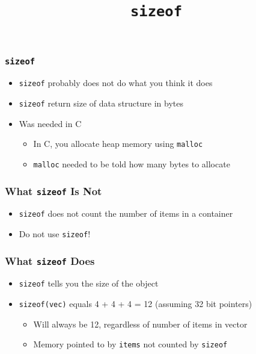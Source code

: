 
\usetikzlibrary{shadows,shapes.multipart}

\title{\texttt{sizeof}}





\begin{frame}
  \titlepage
\end{frame}

\begin{frame}
  \frametitle{\texttt{sizeof}}
  \begin{itemize}
    \item \texttt{sizeof} probably does not do what you think it does
    \item \texttt{sizeof} return size of data structure in bytes
    \item Was needed in C
          \begin{itemize}
            \item In C, you allocate heap memory using \texttt{malloc}
            \item \texttt{malloc} needed to be told how many bytes to allocate
          \end{itemize}
  \end{itemize}
\end{frame}

\begin{frame}
  \frametitle{What \texttt{sizeof} Is Not}
  \begin{itemize}
    \item \texttt{sizeof} does not count the number of items in a container
    \item Do not use \texttt{sizeof}!
  \end{itemize}
\end{frame}

\begin{frame}
  \frametitle{What \texttt{sizeof} Does}
  \begin{itemize}
    \item \texttt{sizeof} tells you the size of the object
    \item \texttt{sizeof(vec)} equals 4 + 4 + 4 = 12 {\tiny (assuming 32 bit pointers)}
          \begin{itemize}
            \item Will always be 12, regardless of number of items in vector
            \item Memory pointed to by \texttt{items} not counted by \texttt{sizeof}
          \end{itemize}
  \end{itemize}
\end{frame}

